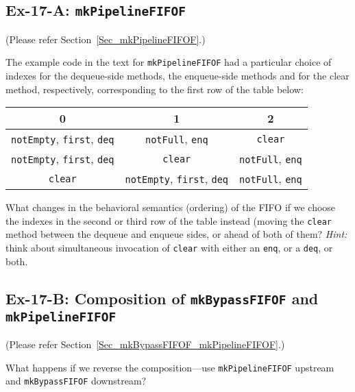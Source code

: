
\subsection*{Ex-17-A: {\tt mkPipelineFIFOF}}
\label{Ex-17-A-PipelineFIFOs}

(Please refer Section~\ref{Sec_mkPipelineFIFOF}.)

The example code in the text for {\tt mkPipelineFIFOF} had a
particular choice of indexes for the dequeue-side methods, the
enqueue-side methods and for the clear method, respectively,
corresponding to the first row of the table below:

\begin{center}
\begin{tabular}{|c|c|c|}
\hline
    0  &  1  &  2 \\
\hline
  {\tt notEmpty}, {\tt first}, {\tt deq}  &
  {\tt notFull}, {\tt enq} &
  {\tt clear} \\
\hline
  {\tt notEmpty}, {\tt first}, {\tt deq} &
  {\tt clear} &
  {\tt notFull}, {\tt enq} \\
\hline
  {\tt clear} &
  {\tt notEmpty}, {\tt first}, {\tt deq} &
  {\tt notFull}, {\tt enq} \\
\hline
\end{tabular}
\end{center}

What changes in the behavioral semantics (ordering) of the FIFO if we
choose the indexes in the second or third row of the table instead
(moving the {\tt clear} method between the dequeue and enqueue sides,
or ahead of both of them?  \emph{Hint:} think about simultaneous
invocation of {\tt clear} with either an {\tt enq}, or a {\tt deq}, or
both.


\subsection*{Ex-17-B: Composition of {\tt mkBypassFIFOF} and {\tt mkPipelineFIFOF}}
\label{Ex-17-B-Pipeline-FIFO-Composition}

(Please refer Section~\ref{Sec_mkBypassFIFOF_mkPipelineFIFOF}.)

What happens if we reverse the composition---use
\verb|mkPipelineFIFOF| upstream and \verb|mkBypassFIFOF| downstream?

